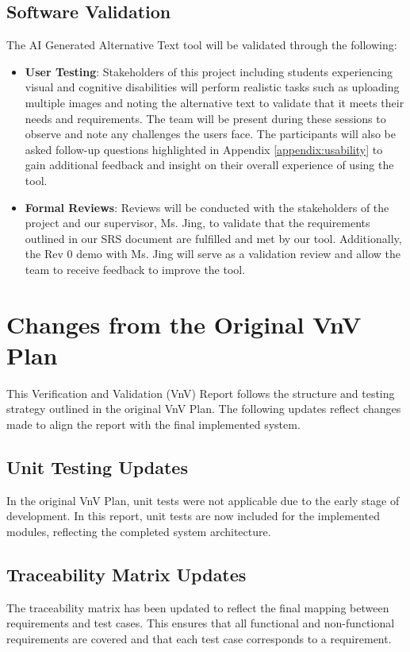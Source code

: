 \documentclass[12pt, titlepage]{article}
\begin{document}
\subsection{Software Validation}
The AI Generated Alternative Text tool will be validated through the following:
\begin{itemize}
  \item \textbf{User Testing}: Stakeholders of this project including
    students experiencing visual
    and cognitive disabilities will perform realistic tasks such as
    uploading multiple images and noting the alternative text
    to validate that it meets their needs and requirements.
    The team will be present during these sessions to observe and
    note any challenges
    the users face. The participants will also be asked follow-up
    questions highlighted in Appendix \ref{appendix:usability} to
    gain additional feedback and insight
    on their overall experience of using the tool.
  \item \textbf{Formal Reviews}: Reviews will be conducted with the
    stakeholders of the project and our supervisor, Ms. Jing, to
    validate that the requirements
    outlined in our SRS document are fulfilled and met by our tool.
    Additionally, the Rev 0 demo with Ms. Jing will serve as a
    validation review and allow the team
    to receive feedback to improve the tool.
\end{itemize}

\clearpage
\section{Changes from the Original VnV Plan}

This Verification and Validation (VnV) Report follows the structure and
testing strategy outlined in the original VnV Plan. The following updates
reflect changes made to align the report with the final implemented system.

\subsection{Unit Testing Updates}
In the original VnV Plan, unit tests were not applicable due to the early
stage of development. In this report, unit tests are now included for the
implemented modules, reflecting the completed system architecture.

\subsection{Traceability Matrix Updates}
The traceability matrix has been updated to reflect the final mapping
between requirements and test cases. This ensures that all functional and
non-functional requirements are covered and that each test case corresponds
to a requirement.
\end{document}
